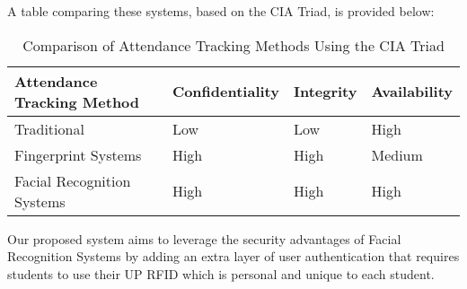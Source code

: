 A table comparing these systems, based on the CIA Triad, is provided below:

\begin{table}[h!]
	\centering
	\begin{tabular}{|l|l|l|l|}
		\hline
		\textbf{Attendance Tracking Method} & \textbf{Confidentiality} & \textbf{Integrity} & \textbf{Availability} \\ \hline
		Traditional & Low & Low & High \\ \hline
		Fingerprint Systems & High & High & Medium \\ \hline
		Facial Recognition Systems & High & High & High \\ \hline
	\end{tabular}
	\caption{Comparison of Attendance Tracking Methods Using the CIA Triad}
\end{table}

Our proposed system aims to leverage the security advantages of Facial Recognition Systems by adding an extra layer of user authentication that requires students to use their UP RFID which is personal and unique to each student.

